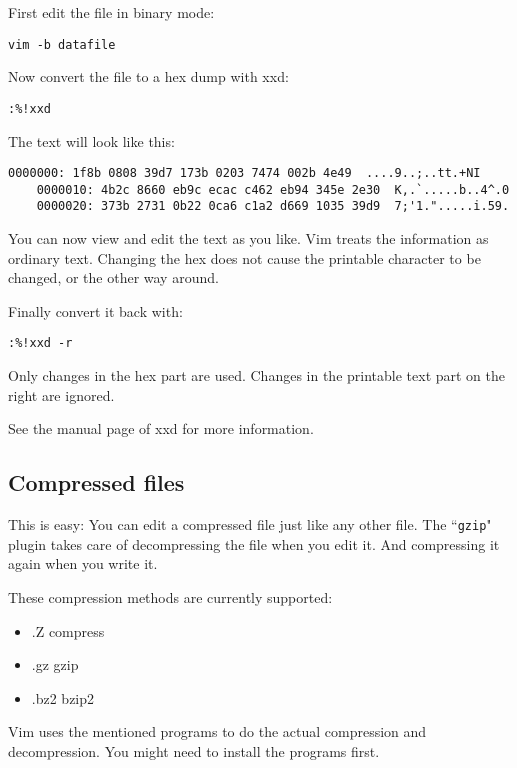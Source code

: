 First edit the file in binary mode:

\begin{Verbatim}[samepage=true]
 vim -b datafile
\end{Verbatim}

Now convert the file to a hex dump with xxd:

\begin{Verbatim}[samepage=true]
 :%!xxd
\end{Verbatim}

The text will look like this:

\begin{Verbatim}[samepage=true]
    0000000: 1f8b 0808 39d7 173b 0203 7474 002b 4e49  ....9..;..tt.+NI
    0000010: 4b2c 8660 eb9c ecac c462 eb94 345e 2e30  K,.`.....b..4^.0
    0000020: 373b 2731 0b22 0ca6 c1a2 d669 1035 39d9  7;'1.".....i.59.
\end{Verbatim}

You can now view and edit the text as you like.
Vim treats the information as ordinary text.
Changing the hex does not cause the printable character to be changed, or the other way around.

Finally convert it back with:

\begin{Verbatim}[samepage=true]
 :%!xxd -r
\end{Verbatim}

Only changes in the hex part are used.
Changes in the printable text part on the right are ignored.

See the manual page of xxd for more information.
\subsection{Compressed files}
This is easy: You can edit a compressed file just like any other file.
The ``\texttt{gzip}" plugin takes care of decompressing the file when you edit it.
And compressing it again when you write it.

These compression methods are currently supported:
\begin{itemize}
				\item .Z    compress
				\item .gz   gzip
				\item .bz2  bzip2
\end{itemize}
Vim uses the mentioned programs to do the actual compression and decompression.
You might need to install the programs first.
\clearpage
